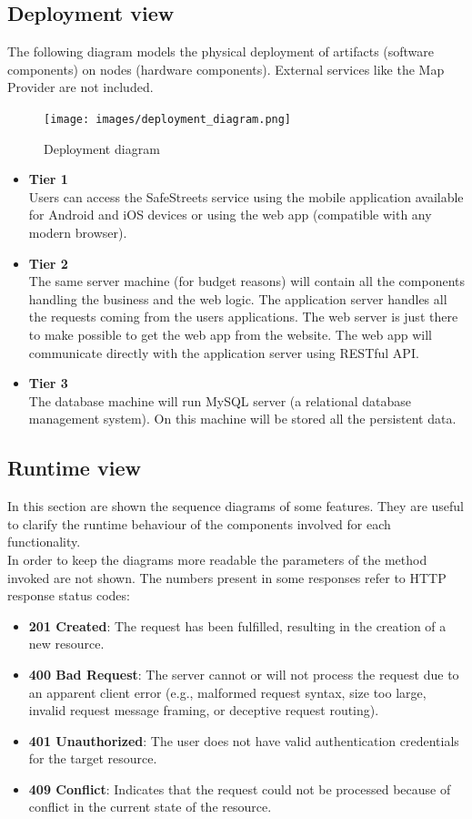 \documentclass{article}
\begin{document}
\newpage

\subsection{Deployment view}
\label{sec:Deployment}
The following diagram models the physical deployment of artifacts (software components) on nodes (hardware components).
External services like the Map Provider are not included.
\begin{figure}[!htb]
\centering
	\texttt{[image: images/deployment\_diagram.png]}
	\caption{Deployment diagram}
	\label{fig:deployment-diagram}
\end{figure}

	
\begin{itemize}
	\item \textbf{Tier 1} \\
		Users can access the SafeStreets service using the mobile application available for Android and iOS devices or using the web app (compatible with any modern browser).
	\item \textbf{Tier 2} \\ 
		The same server machine (for budget reasons)  will contain all the components handling the business and the web logic. The application server handles all the requests coming from the users applications. The web server is just there to make possible to get the web app from the website. The web app will communicate directly with the application server using RESTful API.
	\item \textbf{Tier 3} \\
		The database machine will run MySQL server (a relational database management system). On this machine will be stored all the persistent data.
\end{itemize}

\newpage
\subsection{Runtime view}
\label{sec:Runtime}
 In this section are shown the sequence diagrams of some features. They are useful to clarify the runtime behaviour of the components involved for each functionality.\\
 In order to keep the diagrams more readable the parameters of the method invoked are not shown.
The numbers present in some responses refer to HTTP response status codes:
\begin{itemize}
	\item \textbf{201 Created}: The request has been fulfilled, resulting in the creation of a new resource.
	\item \textbf{400 Bad Request}: The server cannot or will not process the request due to an apparent client error (e.g., malformed request syntax, size too large, invalid request message framing, or deceptive request routing).
	\item \textbf{401 Unauthorized}: The user does not have valid authentication credentials for the target resource.
	\item \textbf{409 Conflict}: Indicates that the request could not be processed because of conflict in the current state of the resource. 
\end{itemize}
\end{document}
